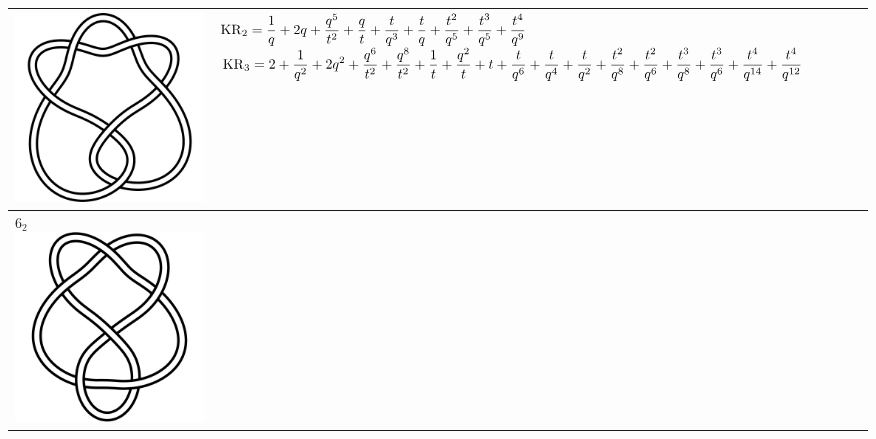\documentclass{compositio}
\theoremstyle{definition}
\numberwithin{equation}{section}
\begin{document}
{\begin{longtable}{p{}|p{}}
\includegraphics[scale=0.07,angle=0]{knot6_1.pdf} 
& 
$
\displaystyle{%
\KR_{2} = \frac{1}{q}+2 q+\frac{q^5}{t^2}+\frac{q}{t}+\frac{t}{q^3}+\frac{t}{q}+\frac{t^2}{q^5}+\frac{t^3}{q^5}+\frac{t^4}{q^9}
}
$
\newline 
$
\displaystyle{%
\KR_{3} = 2+\frac{1}{q^2}+2 q^2+\frac{q^6}{t^2}+\frac{q^8}{t^2}+\frac{1}{t}+\frac{q^2}{t}+t+\frac{t}{q^6}+\frac{t}{q^4}+\frac{t}{q^2}+\frac{t^2}{q^8}+\frac{t^2}{q^6}+\frac{t^3}{q^8}+\frac{t^3}{q^6}+\frac{t^4}{q^{14}}+\frac{t^4}{q^{12}}
}
$
\\
\hline
$6_{2}$ 
\includegraphics[scale=0.07,angle=0]{knot6_2.pdf} 

\end{longtable}}
\end{document}

